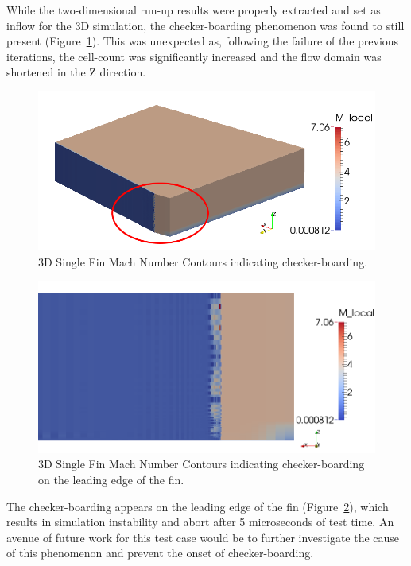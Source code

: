 While the two-dimensional run-up results were properly extracted and set as inflow for the 3D simulation, the checker-boarding phenomenon was found to still present (Figure~\ref{f:tc2:check1}). This was unexpected as, following the failure of the previous iterations, the cell-count was significantly increased and the flow domain was shortened in the Z direction. 
%
\begin{figure}[htbp]
 \begin{center}
  \includegraphics[width=12cm]{./chap7-3Dsinglefin/figs/tc2-mach1.png}
  \caption{3D Single Fin Mach Number Contours indicating checker-boarding.}
  \label{f:tc2:check1}
 \end{center}
\end{figure}
%
%
\begin{figure}[htbp]
 \begin{center}
  \includegraphics[width=12cm]{./chap7-3Dsinglefin/figs/tc2-mach2.png}
  \caption{3D Single Fin Mach Number Contours indicating checker-boarding on the leading edge of the fin.}
  \label{f:tc2:check2}
 \end{center}
\end{figure}
%

The checker-boarding appears on the leading edge of the fin (Figure~\ref{f:tc2:check2}), which results in simulation instability and abort after 5 microseconds of test time.  An avenue of future work for this test case would be to further investigate the cause of this phenomenon and prevent the onset of checker-boarding. 

